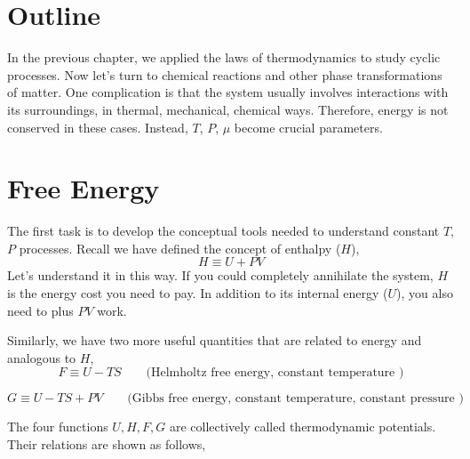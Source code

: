 
\section{Outline}
In the previous chapter, we applied the laws of thermodynamics to study cyclic processes. Now let's turn to chemical reactions and other phase transformations of matter. One complication is that the system usually involves interactions with its surroundings, in thermal, mechanical, chemical ways. Therefore, energy is not conserved in these cases. Instead, $T$, $P$, $\mu$ become crucial parameters.

\section{Free Energy}
The first task is to develop the conceptual tools needed to understand constant $T$, $P$ processes.
Recall we have defined the concept of enthalpy ($H$),
\begin{equation} \label{entropy} 
H \equiv U + PV
\end{equation}
Let's understand it in this way. If you could completely annihilate the system, $H$ is the energy cost you need to pay.
In addition to its internal energy ($U$), you also need to plus $PV$ work.

Similarly, we have two more useful quantities that are related to energy and analogous to $H$,
\begin{equation} \label{entropy} 
F \equiv U - TS    ~~~~~~~~~ \text{(Helmholtz free energy, constant temperature )}
\end{equation}

\begin{equation} \label{entropy} 
G \equiv U - TS + PV   ~~~~~~~~~ \text{(Gibbs free energy, constant temperature, constant pressure )}
\end{equation}

The four functions $U, H, F, G$ are collectively called thermodynamic potentials. Their relations are shown as follows,
\begin{figure}[h]
\centering
{}
\end{figure}

